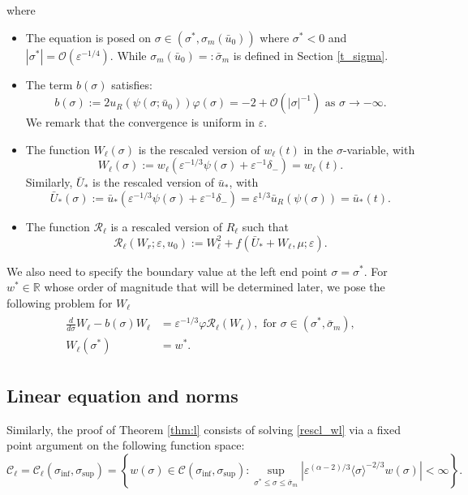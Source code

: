 \documentclass[letterpaper,11pt]{article}
\newcommand{\Ral}{\mathcal{R}}
\newcommand{\rmO}{\mathcal{O}}
\newcommand{\eps}{\varepsilon}
\numberwithin{equation}{section}
\theoremstyle{plain}
\begin{document}
where 
\begin{itemize}
\item The equation is posed on $\sigma \in (\sigma^*, \sigma_m(\bar{u}_0))$ where $\sigma^*<0$ and $|\sigma^*| = \rmO(\eps^{-1/4})$. While $\sigma_m(\bar{u}_0) =: \bar{\sigma}_m$ is defined in Section \ref{t_sigma}.

\item The term $b(\sigma)$ satisfies:
\[
b(\sigma) := 2u_R(\psi(\sigma; \bar{u}_0))\varphi(\sigma) = -2 + \rmO(|\sigma|^{-1}) \text{ as } \sigma \to -\infty.
\]
We remark that the convergence is uniform in $\eps$.

\item The function $W_\ell(\sigma)$ is the rescaled version of $w_\ell(t)$ in the $\sigma$-variable, with 
\[
W_\ell(\sigma):= w_\ell(\eps^{-1/3}\psi(\sigma)+\eps^{-1}\delta_-)=w_\ell(t) .
\]
Similarly, $\bar{U}_*$ is the rescaled version of $\bar{u}_*$, with 
\[
\bar{U}_*(\sigma) := \bar{u}_*(\eps^{-1/3}\psi(\sigma)+\eps^{-1}\delta_-)= \eps^{1/3}\bar{u}_R(\psi(\sigma ) ) =\bar{u}_*(t).
\]

\item The function $\Ral_\ell$ is a rescaled version of $R_\ell$ such that 
\[
\Ral_\ell(W_r;\eps,u_0) := W_\ell^2 + f(\bar{U}_*+W_\ell, \mu;\eps).
\] 
\end{itemize}

We also need to specify the boundary value at the left end point $\sigma = \sigma^*$. For $w^* \in \mathbb{R}$ whose order of magnitude that will be determined later, we pose the following problem for $W_\ell$
\begin{align}\label{wl_bp}
\begin{split}
\frac{d}{d\sigma} W_\ell - b(\sigma)W_\ell &= \eps^{-1/3}\varphi \Ral_\ell(W_\ell), \text{ for }\sigma \in (\sigma^*, \bar{\sigma}_m),\\
W_\ell(\sigma^*) &= w^*.
\end{split}
\end{align}

\subsection{Linear equation and norms}

Similarly, the proof of Theorem \ref{thm:l} consists of solving \eqref{rescl_wl} via a fixed point argument on the following function space:
\[
\mathcal{C}_\ell=\mathcal{C}_{\ell}(\sigma_{\inf}, \sigma_{\sup}) = \left\{ w(\sigma) \in \mathcal{C}(\sigma_{\inf}, \sigma_{\sup}): \sup_{\sigma^*\le \sigma \le\bar{\sigma}_m} |\eps^{(\alpha-2)/3}\langle\sigma \rangle^{-2/3} w(\sigma)|<\infty \right\}.
\]
\end{document}

